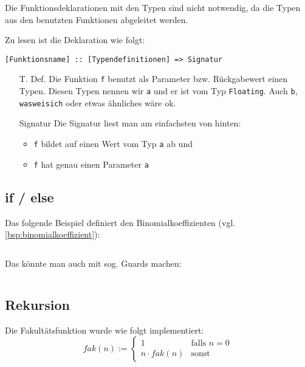 \inputminted[numbersep=5pt, tabsize=4]{haskell}{scripts/haskell/einfaches-beispiel-klammern.hs}

Die Funktionsdeklarationen mit den Typen sind nicht notwendig, da 
die Typen aus den benutzten Funktionen abgeleitet werden.

Zu lesen ist die Deklaration wie folgt:

\begin{center}
\texttt{[Funktionsname] :: \texttt{[Typendefinitionen]} => \texttt{Signatur}}
\end{center}

\begin{itemize}
    \item[T. Def.] Die Funktion \texttt{f} benutzt als Parameter bzw. Rückgabewert
          einen Typen. Diesen Typen nennen wir \texttt{a} und er ist
          vom Typ \texttt{Floating}. Auch \texttt{b}, \texttt{wasweisich}
          oder etwas ähnliches wäre ok.
    \item[Signatur] Die Signatur liest man am einfachsten von hinten:
        \begin{itemize}
            \item \texttt{f} bildet auf einen Wert vom Typ \texttt{a} ab und
            \item \texttt{f} hat genau einen Parameter \texttt{a}
        \end{itemize}
\end{itemize}


\subsection{if / else}
Das folgende Beispiel definiert den Binomialkoeffizienten (vgl. \cref{bsp:binomialkoeffizient}):

\inputminted[numbersep=5pt, tabsize=4]{haskell}{scripts/haskell/binomialkoeffizient.hs}

Das könnte man auch mit sog. Guards machen:

\inputminted[numbersep=5pt, tabsize=4]{haskell}{scripts/haskell/binomialkoeffizient-guard.hs}

\subsection{Rekursion}
Die Fakultätsfunktion wurde wie folgt implementiert:
\[fak(n) := \begin{cases}
        1              &\text{falls } n=0\\
        n \cdot fak(n) &\text{sonst}
    \end{cases}\]
\inputminted[numbersep=5pt, tabsize=4]{haskell}{scripts/haskell/fakultaet.hs}

